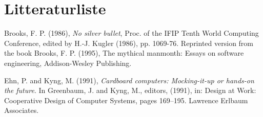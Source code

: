 \documentclass[a4paper,12pt]{article}
\begin{document}
\newpage
\section{Litteraturliste}

\begin{thebibliography}{9}

	Brooks, F. P. (1986), 
	\emph{No silver bullet}, Proc. of the IFIP Tenth World Computing Conference, edited by H.-J. Kugler (1986), pp. 1069-76. Reprinted version from the book Brooks, F. P. (1995), The mythical manmonth: Essays on software engineering, Addison-Wesley Publishing.
	
	Ehn, P. and Kyng, M. (1991), \emph{Cardboard computers: Mocking-it-up or hands-on the future}. In Greenbaum, J. and Kyng, M., editors, (1991), in: Design at Work: Cooperative Design of Computer Systems, pages 169–195. Lawrence Erlbaum Associates.
\end{thebibliography}
\end{document}

